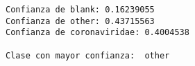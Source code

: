 \documentclass[11pt]{uc3mpracticas}
\begin{document}
    \begin{Verbatim}[commandchars=\\\{\}]
Confianza de blank: 0.16239055
Confianza de other: 0.43715563
Confianza de coronaviridae: 0.4004538

Clase con mayor confianza:  other
    \end{Verbatim}

    \begin{center}
    \end{center}
    { \hspace*{\fill} \\}


\end{document}
